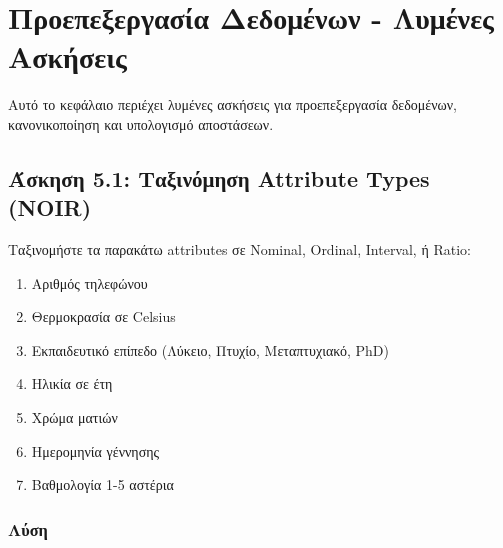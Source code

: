 
\chapter{Προεπεξεργασία Δεδομένων - Λυμένες Ασκήσεις}
\label{ch:data-preprocessing-exercises}

Αυτό το κεφάλαιο περιέχει λυμένες ασκήσεις για προεπεξεργασία δεδομένων,
κανονικοποίηση και υπολογισμό αποστάσεων.

\section{Άσκηση 5.1: Ταξινόμηση Attribute Types (NOIR)}

\begin{formulabox}[Εκφώνηση]
Ταξινομήστε τα παρακάτω attributes σε Nominal, Ordinal, Interval, ή Ratio:

\begin{enumerate}
    \item Αριθμός τηλεφώνου
    \item Θερμοκρασία σε Celsius
    \item Εκπαιδευτικό επίπεδο (Λύκειο, Πτυχίο, Μεταπτυχιακό, PhD)
    \item Ηλικία σε έτη
    \item Χρώμα ματιών
    \item Ημερομηνία γέννησης
    \item Βαθμολογία 1-5 αστέρια
\end{enumerate}
\end{formulabox}

\subsection*{Λύση}


